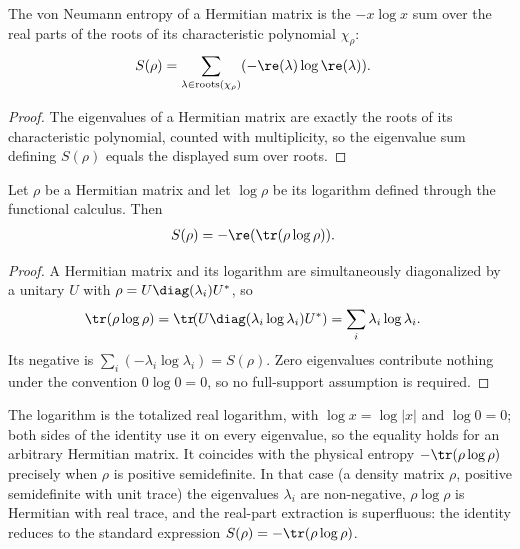 \begin{lemma}
    \label{lem:entropy_charpoly_roots}
    \leanok
    The von Neumann entropy of a Hermitian matrix is the $-x\log x$ sum over the
    real parts of the roots of its characteristic polynomial $\chi_\rho$:
    \begin{align}
        S(\rho)
         & =\sum_{\lambda\in\mathrm{roots}(\chi_\rho)}
            ({-}\re(\lambda)\log\re(\lambda)).
        \label{eq:entropy_charpoly}
    \end{align}
\end{lemma}

\begin{proof}\leanok
    The eigenvalues of a Hermitian matrix are exactly the roots of its
    characteristic polynomial, counted with multiplicity, so the eigenvalue sum
    defining $S(\rho)$ equals the displayed sum over roots.
\end{proof}

\begin{theorem}
    \label{thm:entropy_eq_neg_trace_mul_log}
    \leanok
    Let $\rho$ be a Hermitian matrix and let $\log\rho$ be its logarithm defined
    through the functional calculus. Then
    \begin{align}
        S(\rho)
         & =-\re(\tr(\rho\log\rho)).
        \label{eq:entropy_trace_log}
    \end{align}
\end{theorem}

\begin{proof}\leanok
    A Hermitian matrix and its logarithm are simultaneously diagonalized by a
    unitary $U$ with $\rho=U\diag(\lambda_i)U^*$, so
    \begin{align}
        \tr(\rho\log\rho)
         & =\tr\!(U\diag(\lambda_i\log\lambda_i)U^*)
        =\sum_i\lambda_i\log\lambda_i.
        \notag
    \end{align}
    Its negative is $\sum_i({-}\lambda_i\log\lambda_i)=S(\rho)$. Zero
    eigenvalues contribute nothing under the convention $0\log 0=0$, so no
    full-support assumption is required.
\end{proof}

\begin{remark}
    The logarithm is the totalized real logarithm, with
    $\log x=\log\lvert x\rvert$ and $\log 0=0$; both sides of the identity
    use it on every eigenvalue, so the equality holds for an arbitrary Hermitian
    matrix. It coincides with the physical entropy $-\tr(\rho\log\rho)$
    precisely when $\rho$ is positive semidefinite. In that case (a density
    matrix $\rho$, positive semidefinite with unit trace) the eigenvalues
    $\lambda_i$ are non-negative, $\rho\log\rho$ is Hermitian with real trace,
    and the real-part extraction is superfluous: the identity reduces to the
    standard expression $S(\rho)=-\tr(\rho\log\rho)$.
\end{remark}

